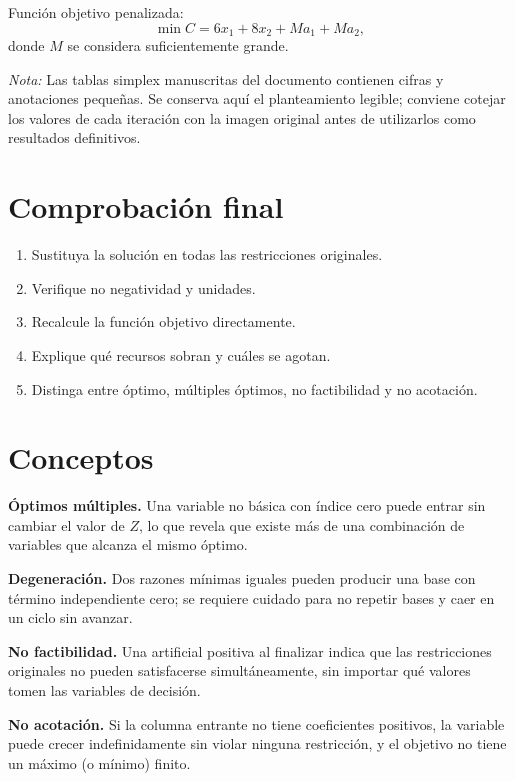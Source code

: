 \documentclass[12pt,a4paper]{article}
\begin{document}
Función objetivo penalizada:
\[
\min C=6x_1+8x_2+Ma_1+Ma_2,
\]
donde \(M\) se considera suficientemente grande.

\textit{Nota:} Las tablas simplex manuscritas del documento contienen cifras y anotaciones pequeñas. Se conserva aquí el planteamiento legible; conviene cotejar los valores de cada iteración con la imagen original antes de utilizarlos como resultados definitivos.

\section{Comprobación final}

\begin{enumerate}
    \item Sustituya la solución en todas las restricciones originales.
    \item Verifique no negatividad y unidades.
    \item Recalcule la función objetivo directamente.
    \item Explique qué recursos sobran y cuáles se agotan.
    \item Distinga entre óptimo, múltiples óptimos, no factibilidad y no acotación.
\end{enumerate}

\section{Conceptos}

\textbf{Óptimos múltiples.} Una variable no básica con índice cero puede entrar sin cambiar el valor de \(Z\), lo que revela que existe más de una combinación de variables que alcanza el mismo óptimo.

\textbf{Degeneración.} Dos razones mínimas iguales pueden producir una base con término independiente cero; se requiere cuidado para no repetir bases y caer en un ciclo sin avanzar.

\textbf{No factibilidad.} Una artificial positiva al finalizar indica que las restricciones originales no pueden satisfacerse simultáneamente, sin importar qué valores tomen las variables de decisión.

\textbf{No acotación.} Si la columna entrante no tiene coeficientes positivos, la variable puede crecer indefinidamente sin violar ninguna restricción, y el objetivo no tiene un máximo (o mínimo) finito.
\end{document}
